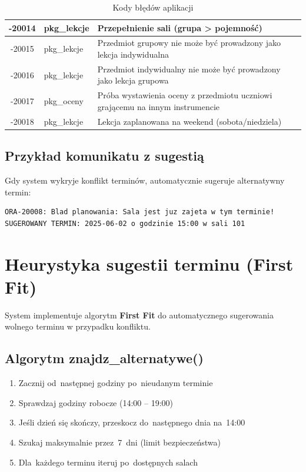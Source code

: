 \documentclass[12pt,a4paper]{article}
\begin{document}
\begin{table}[h]
\begin{tabular}{|c|l|p{6cm}|}
\hline
-20014 & pkg\_lekcje & Przepełnienie sali (grupa > pojemność) \\
\hline
-20015 & pkg\_lekcje & Przedmiot grupowy nie może być prowadzony jako lekcja indywidualna \\
\hline
-20016 & pkg\_lekcje & Przedmiot indywidualny nie może być prowadzony jako lekcja grupowa \\
\hline
-20017 & pkg\_oceny & Próba wystawienia oceny z przedmiotu uczniowi grającemu na innym instrumencie \\
\hline
-20018 & pkg\_lekcje & Lekcja zaplanowana na weekend (sobota/niedziela) \\
\hline
\end{tabular}
\caption{Kody błędów aplikacji}
\end{table}

\subsection{Przykład komunikatu z sugestią}

Gdy system wykryje konflikt terminów, automatycznie sugeruje alternatywny termin:

\begin{verbatim}
ORA-20008: Blad planowania: Sala jest juz zajeta w tym terminie!
SUGEROWANY TERMIN: 2025-06-02 o godzinie 15:00 w sali 101
\end{verbatim}

\newpage
\section{Heurystyka sugestii terminu (First Fit)}

System implementuje algorytm \textbf{First Fit} do automatycznego sugerowania wolnego terminu w przypadku konfliktu.

\subsection{Algorytm znajdz\_alternatywe()}

\begin{enumerate}
    \item Zacznij od~następnej godziny po~nieudanym terminie
    \item Sprawdzaj godziny robocze (14:00 -- 19:00)
    \item Jeśli dzień się skończy, przeskocz do~następnego dnia na~14:00
    \item Szukaj maksymalnie przez~7~dni (limit bezpieczeństwa)
    \item Dla~każdego terminu iteruj po~dostępnych salach
\end{enumerate}
\end{document}
